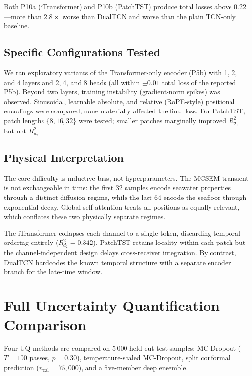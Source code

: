 \documentclass[journal]{IEEEtran}
\begin{document}
Both P10a (iTransformer) and P10b (PatchTST) produce total losses
above 0.22---more than $2.8\times$ worse than DualTCN and worse than
the plain TCN-only baseline.

\subsection{Specific Configurations Tested}

We ran exploratory variants of the Transformer-only encoder (P5b)
with 1, 2, and 4 layers and 2, 4, and 8 heads (all within
$\pm 0.01$ total loss of the reported P5b).  Beyond two layers,
training instability (gradient-norm spikes) was observed.
Sinusoidal, learnable absolute, and relative (RoPE-style) positional
encodings were compared; none materially affected the final loss.
For PatchTST, patch lengths $\{8, 16, 32\}$ were tested; smaller
patches marginally improved $R^2_{\sigma_1}$ but not $R^2_{d_2}$.

\subsection{Physical Interpretation}

The core difficulty is inductive bias, not hyperparameters.  The
MCSEM transient is not exchangeable in time: the first 32 samples
encode seawater properties through a distinct diffusion regime,
while the last 64 encode the seafloor through exponential decay.
Global self-attention treats all positions as equally relevant,
which conflates these two physically separate regimes.

The iTransformer collapses each channel to a single token, discarding
temporal ordering entirely ($R^2_{d_2} = 0.342$).  PatchTST retains
locality within each patch but the channel-independent design delays
cross-receiver integration.  By contrast, DualTCN hardcodes the known
temporal structure with a separate encoder branch for the late-time
window.


\section{Full Uncertainty Quantification Comparison}
\label{sec:supp_uq}

Four UQ methods are compared on 5\,000 held-out test samples:
MC-Dropout ($T = 100$ passes, $p = 0.30$), temperature-scaled
MC-Dropout, split conformal prediction ($n_\mathrm{cal} = 75{,}000$),
and a five-member deep ensemble.
\end{document}
